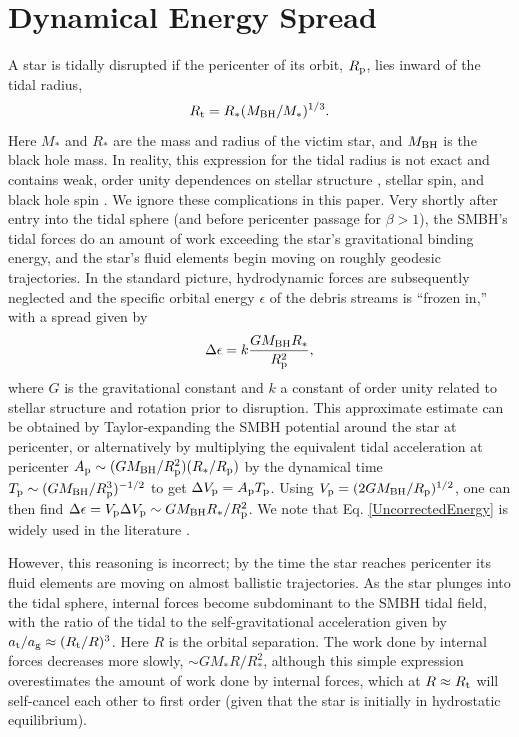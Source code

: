 \documentclass[useAMS, twocolumn, usenatbib]{mn2e}
\begin{document}
\section{Dynamical Energy Spread}
A star is tidally disrupted if the pericenter of its orbit, $R_{\rm p}$, lies inward of the tidal radius,
\begin{equation}
R_{\rm t}=R_*(M_{\rm BH}/M_*)^{1/3}.
\end{equation}
Here $M_*$ and $R_*$ are the mass and radius of the victim star, and $M_{\rm BH}$ is the black hole mass.  In reality, this expression for the tidal radius is not exact and contains weak, order unity dependences on stellar structure \citep{Diener+95}, stellar spin, and black hole spin \citep{Kesden11}.  We ignore these complications in this paper.  Very shortly after entry into the tidal sphere (and before pericenter passage for $\beta>1$), the SMBH's tidal forces do an amount of work exceeding the star's gravitational binding energy, and the star's fluid elements begin moving on roughly geodesic trajectories.  In the standard picture, hydrodynamic forces are subsequently neglected and the specific orbital energy $\epsilon$ of the debris streams is ``frozen in,'' with a spread given by
\begin{equation}
\Delta \epsilon = k\frac{GM_{\rm BH} R_*}{R_{\rm p}^2}, \label{UncorrectedEnergy}
\end{equation}
where $G$ is the gravitational constant and $k$ a constant of order unity related to stellar structure and rotation prior to disruption.  This approximate estimate can be obtained by Taylor-expanding the SMBH potential around the star at pericenter, or alternatively by multiplying the equivalent tidal acceleration at pericenter $A_{\rm p}\sim (GM_{\rm BH}/R_{\rm p}^2)(R_*/R_{\rm p})$ by the dynamical time $T_{\rm p}\sim (GM_{\rm BH}/R_{\rm p}^3)^{-1/2}$ to get $\Delta V_{\rm p}=A_{\rm p}T_{\rm p}$.  Using $V_{\rm p}=(2GM_{\rm BH}/R_{\rm p})^{1/2}$, one can then find $\Delta \epsilon=V_{\rm p}\Delta V_{\rm p} \sim GM_{\rm BH}R_*/R_{\rm p}^2$.  We note that Eq. \ref{UncorrectedEnergy} is widely used in the literature \citep{EvansKochanek89, Kochanek94, Ulmer99, KasenRamirez10, StrubbeQuataert09, LodatoRossi11}.  

 However, this reasoning is incorrect; by the time the star reaches pericenter its fluid elements are moving on almost ballistic trajectories.  As the star plunges into the tidal sphere, internal forces become subdominant to the SMBH tidal field, with the ratio of the tidal to the self-gravitational acceleration given by $a_{\rm t}/a_{\rm g}\approx (R_{\rm t}/R)^3$.  Here $R$ is the orbital separation.  The work done by internal forces decreases more slowly, $\sim GM_*R/R_*^2$, although this simple expression overestimates the amount of work done by internal forces, which at $R\approx R_{\rm t}$ will self-cancel each other to first order (given that the star is initially in hydrostatic equilibrium).  
\end{document}

